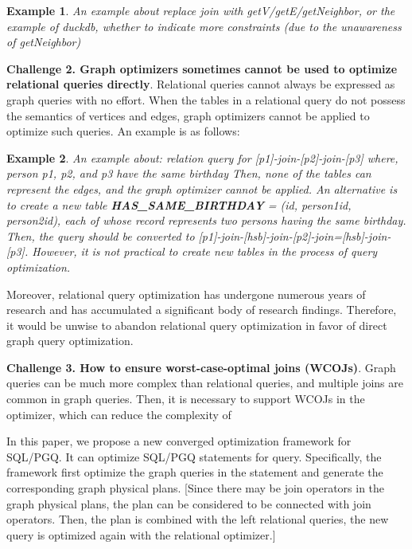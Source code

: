 \documentclass[sigconf, nonacm]{acmart}
\newtheorem{example}{Example}
\begin{document}
\begin{example}
    An example about replace join with getV/getE/getNeighbor,
    or the example of duckdb, whether to indicate more constraints (due to the unawareness of getNeighbor)
\end{example}


\textbf{Challenge 2. Graph optimizers sometimes cannot be used to optimize relational queries directly}.
Relational queries cannot always be expressed as graph queries with no effort.
When the tables in a relational query do not possess the semantics of vertices and edges, graph optimizers cannot be applied to optimize such queries.
An example is as follows:

\begin{example}
    An example about:
    relation query for [p1]-join-[p2]-join-[p3]
    where, person p1, p2, and p3 have the same birthday
    Then, none of the tables can represent the edges, and the graph optimizer cannot be applied.
    An alternative is to create a new table \textbf{HAS\_SAME\_BIRTHDAY} = (id, person1id, person2id), each of whose record represents two persons having the same birthday.
    Then, the query should be converted to [p1]-join-[hsb]-join-[p2]-join=[hsb]-join-[p3].
    However, it is not practical to create new tables in the process of query optimization.
\end{example}

Moreover, relational query optimization has undergone numerous years of research and has accumulated a significant body of research findings.
Therefore, it would be unwise to abandon relational query optimization in favor of direct graph query optimization.


\textbf{Challenge 3. How to ensure worst-case-optimal joins (WCOJs)}.
Graph queries can be much more complex than relational queries, and multiple joins are common in graph queries.
Then, it is necessary to support WCOJs in the optimizer, which can reduce the complexity of 


In this paper, we propose a new converged optimization framework for SQL/PGQ.
It can optimize SQL/PGQ statements for query.
Specifically, the framework first optimize the graph queries in the statement and generate the corresponding graph physical plans.
[Since there may be join operators in the graph physical plans, the plan can be considered to be connected with join operators.
Then, the plan is combined with the left relational queries, the new query is optimized again with the relational optimizer.]
\end{document}
